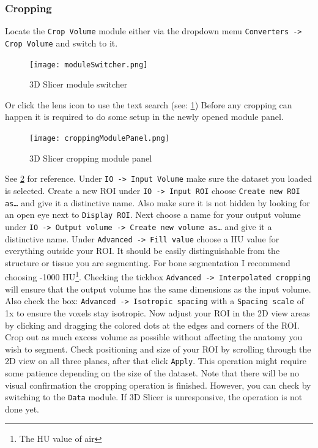\subsubsection{Cropping}\label{crop}
Locate the \texttt{Crop Volume} module either via the dropdown menu
\texttt{Converters -> Crop Volume} and switch to it.
\begin{figure}[h!]
	\centerline{
		\texttt{[image: moduleSwitcher.png]}}
	\caption{3D Slicer module switcher}\label{fig:mS}
\end{figure}
Or click the lens icon to use the text search (see: \cref{fig:mS})
Before any cropping can happen it is required to do some setup in the newly opened module panel.
\begin{figure}[h!]
	\centerline{
		\texttt{[image: croppingModulePanel.png]}}
	\caption{3D Slicer cropping module panel}\label{fig:cMP}
\end{figure}
See \cref{fig:cMP} for reference.
Under \texttt{IO -> Input Volume} make sure the dataset you loaded is selected.
Create a new ROI under \texttt{IO -> Input ROI} choose \texttt{Create new ROI as\ldots} and give it a distinctive name. Also make sure it is not hidden by looking for an open eye next to \texttt{Display ROI}.
Next choose a name for your output volume under \texttt{IO -> Output volume -> Create new volume as\ldots} and give it a distinctive name.
Under \texttt{Advanced -> Fill value} choose a HU value for everything outside your ROI. It should be easily distinguishable from the structure or tissue you are segmenting. For bone segmentation I recommend choosing -1000 HU\footnote{The HU value of air}. Checking the tickbox \texttt{Advanced -> Interpolated cropping} will ensure that the output volume has the same dimensions as the input volume.
Also check the box: \texttt{Advanced -> Isotropic spacing} with a \texttt{Spacing scale} of 1x to ensure the voxels stay isotropic.
Now adjust your ROI in the 2D view areas by clicking and dragging the colored dots at the edges and corners of the ROI.
Crop out as much excess volume as possible without affecting the anatomy you wish to segment.
Check positioning and size of your ROI by scrolling through the 2D view on all three planes, after that click \texttt{Apply}.
This operation might require some patience depending on the size of the dataset.
Note that there will be no visual confirmation the cropping operation is finished.
However, you can check by switching to the \texttt{Data} module.
If 3D Slicer is unresponsive, the operation is not done yet.
